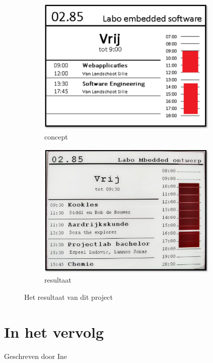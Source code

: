 \documentclass[a4paper,kul]{kulakarticle} %
\begin{document}
\begin{figure}[h]
	\centering
	\begin{subfigure}{0.45\textwidth}
		\centering
		\includegraphics[width=0.95\textwidth]{concept}
		\caption{concept}
		\label{fig:concept}
	\end{subfigure}
	\begin{subfigure}{0.45\textwidth}
		\centering
		\includegraphics[width=0.95\textwidth]{resultaat}
		\caption{resultaat}
		\label{fig:result}
	\end{subfigure}
	\caption{Het resultaat van dit project}
	\label{fig:res}
\end{figure}

\newpage

\section{In het vervolg}
{\scriptsize Geschreven door Ine}
\newline
\end{document}
